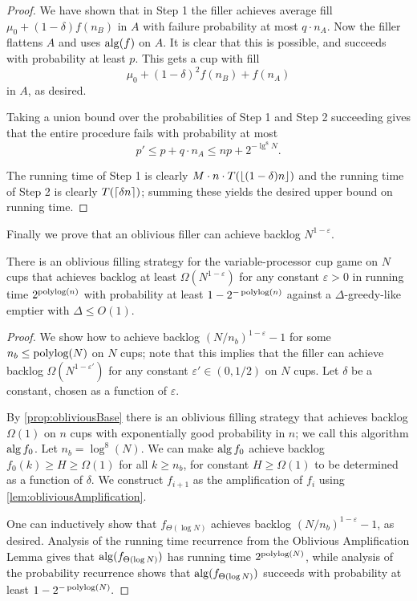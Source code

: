 \begin{proof}
We have shown that in Step 1 the filler achieves average fill
$\mu_0 + (1-\delta)f(n_B)$ in $A$ with failure probability at
most $q \cdot n_A$.
Now the filler flattens $A$ and uses $\operatorname{\text{\textup{alg}}}(f)$ on $A$.
It is clear that this is possible, and succeeds with probability
at least $p$.
This gets a cup with fill 
$$\mu_0 + (1-\delta)^2 f(n_B) + f(n_A)$$
in $A$, as desired.

Taking a union bound over the probabilities of Step 1 and Step 2
succeeding gives that the entire procedure fails with probability
at most 
$$p' \le p + q \cdot n_A \le np + 2^{-\lg^8 N}.$$

The running time of Step 1 is clearly $M\cdot n\cdot
T(\left\lfloor (1-\delta)n \right\rfloor)$ and the running time of Step 2 is clearly
$T(\left\lceil \delta n \right\rceil)$; summing these yields the desired upper
bound on running time.

\end{proof}

Finally we prove that an oblivious filler can achieve backlog
$N^{1-\varepsilon}$. 
\begin{theorem}
  There is an oblivious filling strategy for the
  variable-processor cup game on $N$ cups that achieves backlog
  at least $\Omega(N^{1-\varepsilon})$ for any constant $\varepsilon
  >0$ in running time $2^{\operatorname{\text{polylog}}(n)}$ with probability at least
  $1-2^{-\operatorname{\text{polylog}}(n)}$ against a $\Delta$-greedy-like emptier
  with $\Delta \le O(1)$.
\end{theorem}
\begin{proof}
  We show how to achieve backlog $(N/n_b)^{1-\varepsilon}-1$ for
  some $n_b \le \operatorname{\text{polylog}}(N)$ on $N$ cups; note that this implies
  that the filler can achieve backlog
  $\Omega(N^{1-\varepsilon'})$ for any constant $\varepsilon' \in
  (0,1/2)$ on $N$ cups. Let $\delta$ be a constant, chosen as a
  function of $\varepsilon$.

  By \cref{prop:obliviousBase} there is an oblivious filling
  strategy that achieves backlog $\Omega(1)$ on $n$ cups with
  exponentially good probability in $n$; we call this algorithm
  $\operatorname{\text{\textup{alg}}}{f_0}$. Let $n_b = \log^8(N)$. We can make $\operatorname{\text{\textup{alg}}}{f_0}$
  achieve backlog $f_0(k) \ge H \ge \Omega(1)$ for all $k \ge
  n_b$, for constant $H \ge \Omega(1)$ to be determined as a
  function of $\delta$. We construct $f_{i+1}$ as the
  amplification of $f_i$ using \cref{lem:obliviousAmplification}.

  One can inductively show that $f_{\Theta(\log N)}$ achieves
  backlog $(N/n_b)^{1-\varepsilon} -1$, as desired. 
  Analysis of the running time recurrence from the Oblivious Amplification
  Lemma gives that $\operatorname{\text{\textup{alg}}}(f_{\Theta(\log N)})$ has running time
  $2^{\operatorname{\text{polylog}}(N)}$, while analysis of the probability recurrence
  shows that $\operatorname{\text{\textup{alg}}}(f_{\Theta(\log N)})$ succeeds with probability
  at least $1-2^{-\operatorname{\text{polylog}}(N)}.$
\end{proof}


